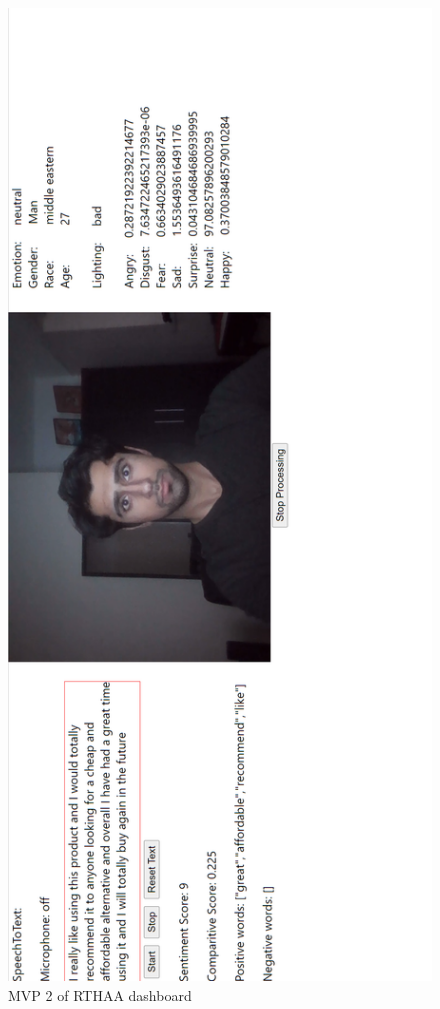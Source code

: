 \documentclass[12pt, a4paper]{article}
\begin{document}
\begin{appendices}
\begin{figure}[H]
    \centering
    \includegraphics[scale=0.45]{images/webapp4.png}
    \caption{MVP 2 of RTHAA dashboard}
    \label{fig:wa3}
\end{figure}


\end{appendices}
\end{document}

